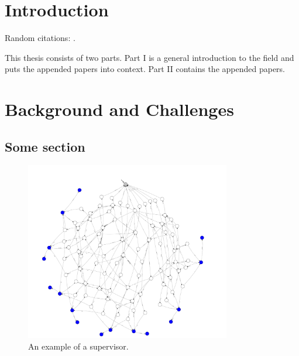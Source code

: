 
\chapter{Introduction}

\lipsum[10-20]  %

Random citations: \cite{Amilhastre2002,Sinz2003,Astesana2010a,Astesana2010b}.

This thesis consists of two parts. Part I is a general introduction to the field and puts the appended papers into context. Part II contains the appended papers.




%
%
%
\chapter{Background and Challenges\label{ch:bg}}

\lipsum[5]


\section{Some section}

\lipsum[3]

\begin{figure}
\centering
\includegraphics[width=0.8\textwidth]{kappa/images/supervisor}
\caption{An example of a supervisor.\label{fig:kappa-sup}}
\end{figure}

